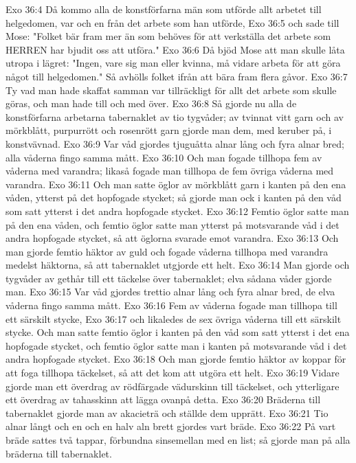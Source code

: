 Exo 36:4  Då kommo alla de konstförfarna män som utförde allt arbetet till helgedomen, var och en från det arbete som han utförde,
Exo 36:5  och sade till Mose: "Folket bär fram mer än som behöves för att verkställa det arbete som HERREN har bjudit oss att utföra."
Exo 36:6  Då bjöd Mose att man skulle låta utropa i lägret: "Ingen, vare sig man eller kvinna, må vidare arbeta för att göra något till helgedomen." Så avhölls folket ifrån att bära fram flera gåvor.
Exo 36:7  Ty vad man hade skaffat samman var tillräckligt för allt det arbete som skulle göras, och man hade till och med över.
Exo 36:8  Så gjorde nu alla de konstförfarna arbetarna tabernaklet av tio tygvåder; av tvinnat vitt garn och av mörkblått, purpurrött och rosenrött garn gjorde man dem, med keruber på, i konstvävnad.
Exo 36:9  Var våd gjordes tjuguåtta alnar lång och fyra alnar bred; alla våderna fingo samma mått.
Exo 36:10  Och man fogade tillhopa fem av våderna med varandra; likaså fogade man tillhopa de fem övriga våderna med varandra.
Exo 36:11  Och man satte öglor av mörkblått garn i kanten på den ena våden, ytterst på det hopfogade stycket; så gjorde man ock i kanten på den våd som satt ytterst i det andra hopfogade stycket.
Exo 36:12  Femtio öglor satte man på den ena våden, och femtio öglor satte man ytterst på motsvarande våd i det andra hopfogade stycket, så att öglorna svarade emot varandra.
Exo 36:13  Och man gjorde femtio häktor av guld och fogade våderna tillhopa med varandra medelst häktorna, så att tabernaklet utgjorde ett helt.
Exo 36:14  Man gjorde och tygvåder av gethår till ett täckelse över tabernaklet; elva sådana våder gjorde man.
Exo 36:15  Var våd gjordes trettio alnar lång och fyra alnar bred, de elva våderna fingo samma mått.
Exo 36:16  Fem av våderna fogade man tillhopa till ett särskilt stycke,
Exo 36:17  och likaledes de sex övriga våderna till ett särskilt stycke. Och man satte femtio öglor i kanten på den våd som satt ytterst i det ena hopfogade stycket, och femtio öglor satte man i kanten på motsvarande våd i det andra hopfogade stycket.
Exo 36:18  Och man gjorde femtio häktor av koppar för att foga tillhopa täckelset, så att det kom att utgöra ett helt.
Exo 36:19  Vidare gjorde man ett överdrag av rödfärgade vädurskinn till täckelset, och ytterligare ett överdrag av tahasskinn att lägga ovanpå detta.
Exo 36:20  Bräderna till tabernaklet gjorde man av akacieträ och ställde dem upprätt.
Exo 36:21  Tio alnar långt och en och en halv aln brett gjordes vart bräde.
Exo 36:22  På vart bräde sattes två tappar, förbundna sinsemellan med en list; så gjorde man på alla bräderna till tabernaklet.
